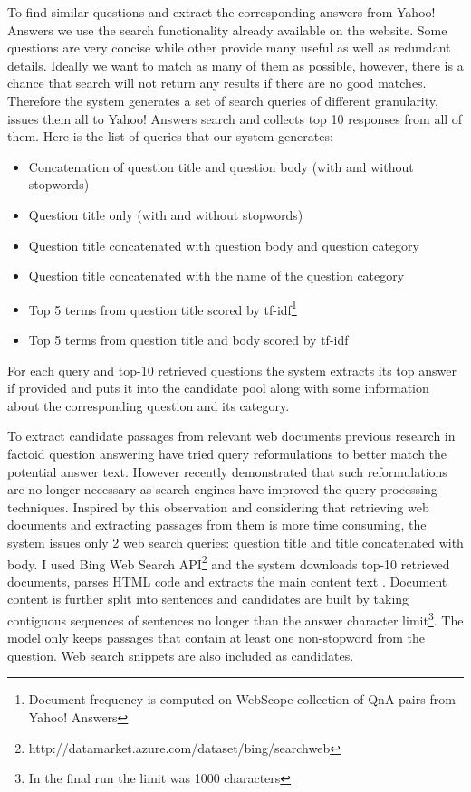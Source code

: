 To find similar questions and extract the corresponding answers from Yahoo! Answers we use the search functionality already available on the website.
Some questions are very concise while other provide many useful as well as redundant details.
Ideally we want to match as many of them as possible, however, there is a chance that search will not return any results if there are no good matches.
Therefore the system generates a set of search queries of different granularity, issues them all to Yahoo! Answers search and collects top 10 responses from all of them.
Here is the list of queries that our system generates:
\begin{itemize}
	\item Concatenation of question title and question body (with and without stopwords)
	\item Question title only (with and without stopwords)
	\item Question title concatenated with question body and question category
	\item Question title concatenated with the name of the question category
	\item Top 5 terms from question title scored by tf-idf\footnote{Document frequency is computed on WebScope collection of QnA pairs from Yahoo! Answers}
	\item Top 5 terms from question title and body scored by tf-idf
\end{itemize}

For each query and top-10 retrieved questions the system extracts its top answer if provided and puts it into the candidate pool along with some information about the corresponding question and its category.

To extract candidate passages from relevant web documents previous research in factoid question answering have tried query reformulations \cite{Agichtein:2001:LSE:371920.371976} to better match the potential answer text.
However recently \cite{tsai2015web} demonstrated that such reformulations are no longer necessary as search engines have improved the query processing techniques.
Inspired by this observation and considering that retrieving web documents and extracting passages from them is more time consuming, the system issues only 2 web search queries: question title and title concatenated with body. 
I used Bing Web Search API\footnote{http://datamarket.azure.com/dataset/bing/searchweb} and the system downloads top-10 retrieved documents, parses HTML code and extracts the main content text \cite{Kohlschutter_2010}.
Document content is further split into sentences \cite{manning-EtAl:2014:P14-5} and candidates are built by taking contiguous sequences of sentences no longer than the answer character limit\footnote{In the final run the limit was 1000 characters}.
The model only keeps passages that contain at least one non-stopword from the question.
Web search snippets are also included as candidates.

